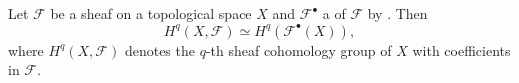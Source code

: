 \documentclass[12pt]{article}
\begin{document}
Let $\mathcal F$ be a sheaf on a topological space $X$ and $\mathcal F^\bullet$ a  of $\mathcal F$ by .
Then 
$$
H^q(X,\mathcal F)\simeq H^q(\mathcal F^\bullet(X)),
$$
where $H^q(X,\mathcal F)$ denotes the $q$-th sheaf cohomology group of $X$ with coefficients in $\mathcal F$.
\end{document}
